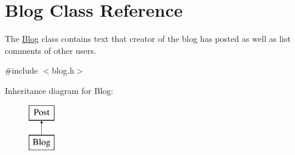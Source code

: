 \hypertarget{classBlog}{}\section{Blog Class Reference}
\label{classBlog}


The \hyperlink{classBlog}{Blog} class contains text that creator of the blog has posted as well as list comments of other users.  




{\ttfamily \#include $<$blog.\+h$>$}

Inheritance diagram for Blog\+:\begin{figure}[H]
\begin{center}
\leavevmode
\includegraphics[height=2.000000cm]{classBlog}
\end{center}
\end{figure}
